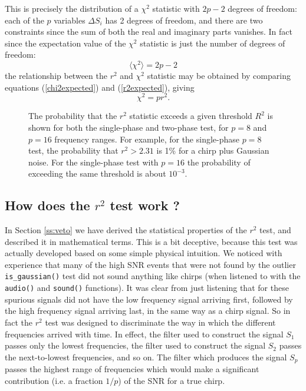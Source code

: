 This is precisely the distribution of a $\chi^2$ statistic with $2p-2$
degrees of freedom: each of the $p$ variables $\Delta S_i$ has 2 degrees
of freedom, and there are two constraints since the sum of both the real
and imaginary parts vanishes.  In fact since the expectation value of the
$\chi^2$ statistic is just the number of degrees of freedom:
\begin{equation}
\label{chi2expected}
\langle \chi^2 \rangle = 2 p - 2
\end{equation}
the relationship between the $r^2$ and $\chi^2$ statistic may be obtained
by comparing equations (\ref{chi2expected}) and (\ref{r2expected}), giving
\begin{equation}
\chi^2 = p r^2.
\end{equation}
\begin{figure}
\begin{center}
\caption{ \label{f:rsquared}
The probability that the $r^2$ statistic exceeds a given threshold $R^2$
is shown for both the single-phase and two-phase test, for $p=8$ and
$p=16$ frequency ranges.  For example, for the single-phase $p=8$ test,
the probability that $r^2 > 2.31$ is 1\% for a chirp plus Gaussian noise.
For the single-phase test with $p=16$ the probability of exceeding the
same threshold is about $10^{-3}$.
}
\end{center}
\end{figure}

\clearpage

\subsection{ How does the $r^2$ test work ?}
In Section \ref{ss:veto} we have derived the statistical properties of
the $r^2$ test, and described it in mathematical terms.  This is a
bit deceptive, because this test was actually developed based on some
simple physical intuition.  We noticed with experience that many of the
high SNR events that were not found by the outlier {\tt is\_gaussian()}
test did not sound anything like chirps (when listened to with the {\tt
audio()} and {\tt sound()} functions).  It was clear from just listening
that for these spurious signals did not have the low frequency signal
arriving first, followed by the high frequency signal arriving last,
in the same way as a chirp signal.  So in fact the $r^2$ test was
designed to discriminate the way in which the different frequencies
arrived with time.  In effect, the filter used to construct the signal
$S_1$ passes only the lowest frequencies, the filter used to construct
the signal $S_2$ passes the next-to-lowest frequencies, and so on.
The filter which produces the signal $S_p$ passes the highest range of
frequencies which would make a significant contribution (i.e. a fraction
$1/p$) of the SNR for a true chirp.

